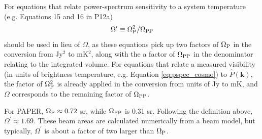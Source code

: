 \documentclass[twocolumn,apj,numberedappendix]{emulateapj}
\def\k{\mathbf{k}}
\begin{document}
For equations that relate power-spectrum sensitivity to a system temperature
(e.g. Equations 15 and 16 in P12a)
\begin{equation}
\Omega^\prime\equiv\Omega_{\rm P}^2/\Omega_{\rm PP}
\end{equation}
should be used in lieu of $\Omega$, as
these equations pick up two factors of $\Omega_{\rm P}$ in the conversion from Jy$^2$ to mK$^2$, along with
the a factor of $\Omega_{\rm PP}$ in the denominator relating to the integrated volume.
For equations that relate a measured visibility (in units of brightness
temperature, e.g. Equation \ref{eq:pspec_cosmo}) to $\widehat P(\k)$, the factor of 
$\Omega_{\rm P}^2$ is already 
applied in the conversion from units of Jy to mK, 
and $\Omega$ corresponds to the remaining factor of $\Omega_{\rm PP}$. 

For PAPER, $\Omega_{\rm P}\approx0.72$ sr, while $\Omega_{\rm PP}$ is 0.31 sr.  Following the definition
above, $\Omega^\prime\approx1.69$.  These beam areas are calculated numerically from
a beam model, but typically, $\Omega^\prime$ is about a factor of two larger than $\Omega_{\rm P}$.



\end{document}
